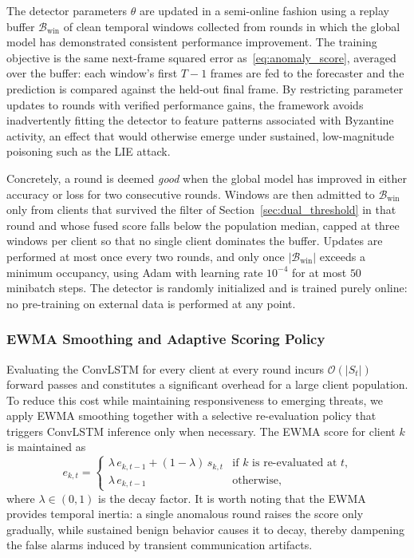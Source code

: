 \documentclass[journal]{IEEEtran}
\begin{document}
The detector parameters $\theta$ are updated in a semi-online fashion using a replay buffer $\mathcal{B}_{\text{win}}$ of clean temporal windows collected from rounds in which the global model has demonstrated consistent performance improvement. The training objective is the same next-frame squared error as~\eqref{eq:anomaly_score}, averaged over the buffer: each window's first $T-1$ frames are fed to the forecaster and the prediction is compared against the held-out final frame. By restricting parameter updates to rounds with verified performance gains, the framework avoids inadvertently fitting the detector to feature patterns associated with Byzantine activity, an effect that would otherwise emerge under sustained, low-magnitude poisoning such as the LIE attack.

Concretely, a round is deemed \emph{good} when the global model has improved in either accuracy or loss for two consecutive rounds. Windows are then admitted to $\mathcal{B}_{\text{win}}$ only from clients that survived the filter of Section~\ref{sec:dual_threshold} in that round and whose fused score falls below the population median, capped at three windows per client so that no single client dominates the buffer. Updates are performed at most once every two rounds, and only once $|\mathcal{B}_{\text{win}}|$ exceeds a minimum occupancy, using Adam with learning rate $10^{-4}$ for at most $50$ minibatch steps. The detector is randomly initialized and is trained purely online: no pre-training on external data is performed at any point.

\subsubsection{EWMA Smoothing and Adaptive Scoring Policy}
Evaluating the ConvLSTM for every client at every round incurs $\mathcal{O}(|S_t|)$ forward passes and constitutes a significant overhead for a large client population. To reduce this cost while maintaining responsiveness to emerging threats, we apply EWMA smoothing together with a selective re-evaluation policy that triggers ConvLSTM inference only when necessary. The EWMA score for client $k$ is maintained as
\begin{equation}
e_{k,t} =
\begin{cases}
\lambda \, e_{k,t-1} + (1 - \lambda) \, s_{k,t} & \text{if $k$ is re-evaluated at $t$,}\\
\lambda \, e_{k,t-1} & \text{otherwise,}
\end{cases}
\label{eq:ewma}
\end{equation}
where $\lambda \in (0,1)$ is the decay factor. It is worth noting that the EWMA provides temporal inertia: a single anomalous round raises the score only gradually, while sustained benign behavior causes it to decay, thereby dampening the false alarms induced by transient communication artifacts.
\end{document}
